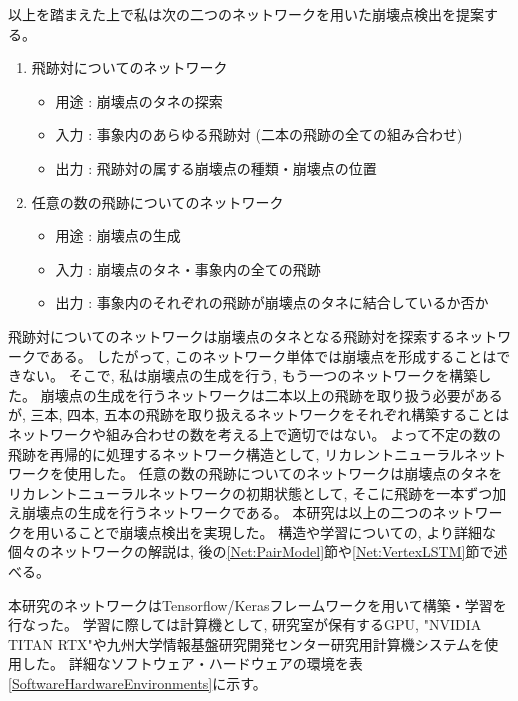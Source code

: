 以上を踏まえた上で私は次の二つのネットワークを用いた崩壊点検出を提案する。

\begin{enumerate}
 \item 飛跡対についてのネットワーク
 \begin{itemize}
  \item 用途 : 崩壊点のタネの探索
  \item 入力 : 事象内のあらゆる飛跡対 (二本の飛跡の全ての組み合わせ)
  \item 出力 : 飛跡対の属する崩壊点の種類・崩壊点の位置
 \end{itemize}
 \item 任意の数の飛跡についてのネットワーク
 \begin{itemize}
  \item 用途 : 崩壊点の生成
  \item 入力 : 崩壊点のタネ・事象内の全ての飛跡
  \item 出力 : 事象内のそれぞれの飛跡が崩壊点のタネに結合しているか否か
 \end{itemize}
\end{enumerate}

飛跡対についてのネットワークは崩壊点のタネとなる飛跡対を探索するネットワークである。
したがって, このネットワーク単体では崩壊点を形成することはできない。
そこで, 私は崩壊点の生成を行う, もう一つのネットワークを構築した。
崩壊点の生成を行うネットワークは二本以上の飛跡を取り扱う必要があるが, 三本, 四本, 五本の飛跡を取り扱えるネットワークをそれぞれ構築することはネットワークや組み合わせの数を考える上で適切ではない。
よって不定の数の飛跡を再帰的に処理するネットワーク構造として, リカレントニューラルネットワークを使用した。
任意の数の飛跡についてのネットワークは崩壊点のタネをリカレントニューラルネットワークの初期状態として, そこに飛跡を一本ずつ加え崩壊点の生成を行うネットワークである。
本研究は以上の二つのネットワークを用いることで崩壊点検出を実現した。
構造や学習についての, より詳細な個々のネットワークの解説は, 後の\ref{Net:PairModel}節や\ref{Net:VertexLSTM}節で述べる。

本研究のネットワークはTensorflow/Kerasフレームワークを用いて構築・学習を行なった。
学習に際しては計算機として, 研究室が保有するGPU, "NVIDIA TITAN RTX"や九州大学情報基盤研究開発センター研究用計算機システムを使用した。
詳細なソフトウェア・ハードウェアの環境を表\ref{SoftwareHardwareEnvironments}に示す。


